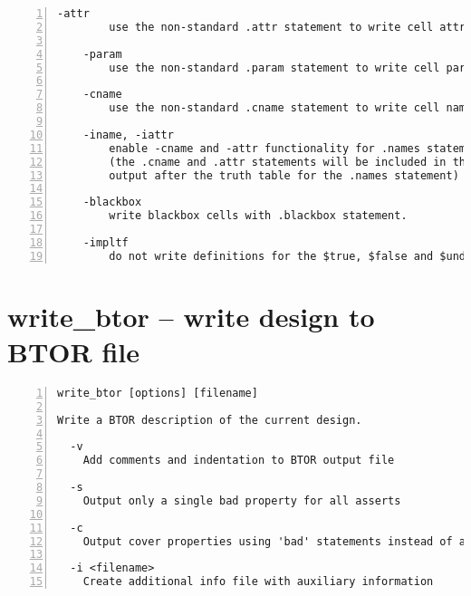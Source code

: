\begin{lstlisting}[numbers=left,frame=single]
    -attr
        use the non-standard .attr statement to write cell attributes

    -param
        use the non-standard .param statement to write cell parameters

    -cname
        use the non-standard .cname statement to write cell names

    -iname, -iattr
        enable -cname and -attr functionality for .names statements
        (the .cname and .attr statements will be included in the BLIF
        output after the truth table for the .names statement)

    -blackbox
        write blackbox cells with .blackbox statement.

    -impltf
        do not write definitions for the $true, $false and $undef wires.
\end{lstlisting}

\section{write\_btor -- write design to BTOR file}
\label{cmd:write_btor}
\begin{lstlisting}[numbers=left,frame=single]
    write_btor [options] [filename]

Write a BTOR description of the current design.

  -v
    Add comments and indentation to BTOR output file

  -s
    Output only a single bad property for all asserts

  -c
    Output cover properties using 'bad' statements instead of asserts

  -i <filename>
    Create additional info file with auxiliary information
\end{lstlisting}

